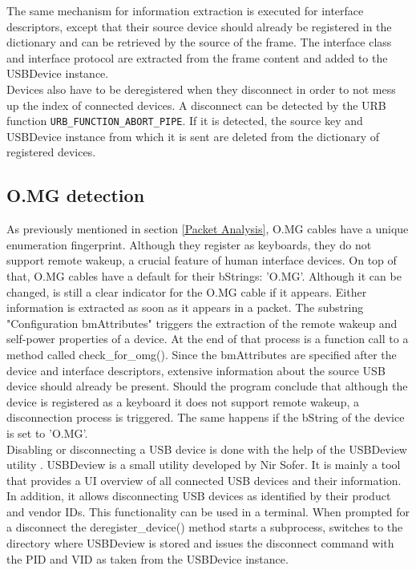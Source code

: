 The same mechanism for information extraction is executed for interface descriptors, except that their source device should already be registered in the dictionary and can be retrieved by the source of the frame. The interface class and interface protocol are extracted from the frame content and added to the USBDevice instance.\\
Devices also have to be deregistered when they disconnect in order to not mess up the index of connected devices. A disconnect can be detected by the URB function \verb|URB_FUNCTION_ABORT_PIPE|. If it is detected, the source key and USBDevice instance from which it is sent are deleted from the dictionary of registered devices.


\subsection{O.MG detection}

As previously mentioned in section \ref{Packet Analysis}, O.MG cables have a unique enumeration fingerprint. Although they register as keyboards, they do not support remote wakeup, a crucial feature of human interface devices. On top of that, O.MG cables have a default for their bStrings: 'O.MG'. Although it can be changed, is still a clear indicator for the O.MG cable if it appears. Either information is extracted as soon as it appears in a packet. The substring "Configuration bmAttributes" triggers the extraction of the remote wakeup and self-power properties of a device. At the end of that process is a function call to a method called check\_for\_omg(). Since the bmAttributes are specified after the device and interface descriptors, extensive information about the source USB device should already be present. Should the program conclude that although the device is registered as a keyboard it does not support remote wakeup, a disconnection process is triggered. The same happens if the bString of the device is set to 'O.MG'. \\
Disabling or disconnecting a USB device is done with the help of the USBDeview utility \cite{ViewAnyInstalled}. USBDeview is a small utility developed by Nir Sofer. It is mainly a tool that provides a UI overview of all connected USB devices and their information. In addition, it allows disconnecting USB devices as identified by their product and vendor IDs. This functionality can be used in a terminal. When prompted for a disconnect the deregister\_device() method starts a subprocess, switches to the directory where USBDeview is stored and issues the disconnect command with the PID and VID as taken from the USBDevice instance.


